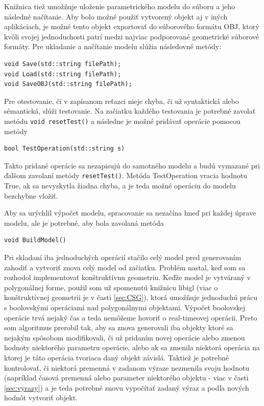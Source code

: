 Knižnica tiež umožňuje uloženie parametrického modelu do  súboru a jeho následné načítanie. Aby bolo možné použiť vytvorený objekt aj v iných aplikáciach, je možné tento objekt exportovať do súborového formátu OBJ, ktorý kvôli svojej jednoduchosti patrí medzi najviac podporované geometrické súborové formáty. Pre ukladanie a načítanie modelu slúžia následovné metódy:
\lstset {language=C++}
\begin{lstlisting}
void Save(std::string filePath);
void Load(std::string filePath);
void SaveOBJ(std::string filePath);
\end{lstlisting}

Pre otestovanie, či v zapísanom reťazci nieje chyba, či už syntaktická alebo sémantická, slúži testovanie. Na začiatku každého testovania je potrebné zavolať metódu \texttt{void resetTest()} a následne je možné pridávať operácie pomocou metódy 
\lstset {language=C++}
\begin{lstlisting}
bool TestOperation(std::string s)
\end{lstlisting}
Takto pridané operácie sa nezapisujú do samotného modelu a budú vymazané pri ďalšom zavolaní metódy \texttt{resetTest()}. Metóda TestOperation vracia hodnotu True, ak sa nevyskytla žiadna chyba, a je teda možné operáciu do modelu bezchybne vložiť.


Aby sa urýchlil výpočet modelu, spracovanie sa nezačína hneď pri každej úprave modelu, ale je potrebné, aby bola zavolaná metóda 
\begin{lstlisting}
void BuildModel()
\end{lstlisting}
Pri skladaní iba jednoduchých operácií stačilo celý model pred generovaním zahodiť a vytvoriť znova celý model od začiatku. Problém nastal, keď som sa rozhodol implementovať konštruktívnu geometriu. Keďže model je vytváraný v polygonálnej forme, použil som už spomenutú knižnicu libigl (viac o konštruktívnej geometrii je v časti \ref{sec:CSG}), ktorá umožňuje jednoduchú prácu s boolovskými operáciami nad polygonálnymi objektami. Výpočet boolovskej operácie trvá nejaký čas a teda nemôžeme hovoriť o  real-timeovej operácii. Preto som algoritmus prerobil tak, aby sa znova generovali iba objekty ktoré sa nejakým spôsobom modifikovali, či už pridaním novej operácie alebo zmenou hodnoty niektorého parametru operácie, alebo ak sa zmenila niektorá operácia na ktorej je táto operácia tvoriaca daný objekt závislá. Taktiež je potrebné kontrolovať, či niektorá premenná v zadanom výraze nezmenila svoju hodnotu (napríklad časová premenná alebo parameter niektorého objektu - viac v časti \ref{sec:vyrazy}) a je teda potrebné znovu vypočítať zadaný výraz a podľa nových hodnôt vytvoriť objekt. 

